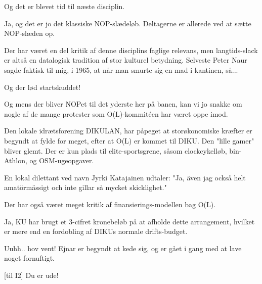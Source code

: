 \documentclass[a4paper,11pt]{article}
\begin{document}
\begin{sketch}
   Og det er blevet tid til næste disciplin.


   Ja, og det er jo det klassiske NOP-slædeløb.  Deltagerne
  er allerede ved at sætte NOP-slæden op.


   Der har været en del kritik af denne disciplins faglige
  relevans, men langtids-slack er altså en datalogisk tradition af
  stor kulturel betydning.  Selveste Peter Naur sagde faktisk til mig,
  i 1965, at når man smurte sig en mad i kantinen, så...


   Og der lød startskuddet!


   Og mens der bliver NOPet til det yderste her på banen, kan vi jo
  snakke om nogle af de mange protester som O(L)-kommitéen har været
  oppe imod.

   Den lokale idrætsforening DIKULAN, har påpeget at
  storøkonomiske kræfter er begyndt at fylde for meget, efter at O(L)
  er kommet til DIKU. Den "lille gamer" bliver glemt. Der er kun plads
  til elite-sportsgrene, såsom clockcykelløb, bin-Athlon, og
  OSM-ugeopgaver.

   En lokal dilettant ved navn Jyrki Katajainen udtaler: "Ja, även
  jag också helt amatörmässigt och inte gillar så mycket skicklighet."


   Der har også været meget kritik af finansierings-modellen bag O(L).

   Ja, KU har brugt et 3-cifret kronebeløb på at afholde dette
  arrangement, hvilket er mere end en fordobling af DIKUs normale
  drifts-budget.


   Uuhh.. hov vent! Ejnar er begyndt at kede sig, og er gået
  i gang med at lave noget fornuftigt.

  [til I2] Du er ude!



\end{sketch}
\end{document}
